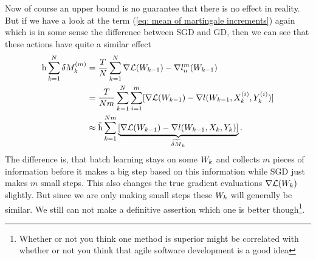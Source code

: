 Now of course an upper bound is no guarantee that there is no effect in reality.
But if we have a look at the term (\ref{eq: mean of martingale increments})
again which is in some sense the difference between SGD and GD, then we can
see that these actions have quite a similar effect
\begin{align*}
	\text{h}\sum_{k=1}^N\delta M_k^{(m)}
	&=\frac{T}{N}\sum_{k=1}^N
	\nabla\mathcal{L}(W_{k-1})- \nabla l_n^m(W_{k-1})\\
	&=\frac{T}{Nm}\sum_{k=1}^N\sum_{i=1}^m
	[\nabla\mathcal{L}(W_{k-1})-\nabla l(W_{k-1},X^{(i)}_k, Y^{(i)}_k)]\\
	&\approx \tilde{\text{h}} \sum_{k=1}^{Nm}
	\underbrace{
		[\nabla\mathcal{L}(W_{k-1})-\nabla l(W_{k-1},X_k, Y_k)]
	}_{\widetilde{\delta M}_k}.
\end{align*}
The difference is, that batch learning stays on some \(W_k\) and collects
\(m\) pieces of information before it makes a big step based on this information
while SGD just makes \(m\) small steps. This also changes the true gradient
evaluations \(\nabla\mathcal{L}(W_k)\) slightly. But since we are only making
small steps these \(W_k\) will generally be similar. We still can not
make a definitive assertion which one is better though\footnote{
	Whether or not you think one method is superior might be correlated with
	whether or not you think that agile software development is a good idea
}.

